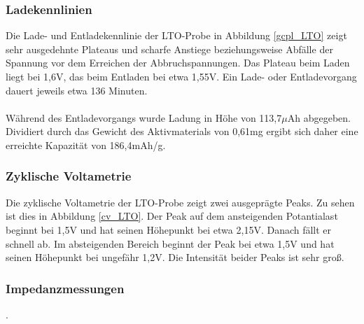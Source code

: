 \documentclass[a4paper, 11pt, headsepline,footsepline,twoside,abstract]{scrbook}
\begin{document}
\subsubsection{Ladekennlinien}
Die Lade- und Entladekennlinie der LTO-Probe in Abbildung \ref{gcpl_LTO} zeigt sehr ausgedehnte Plateaus und scharfe Anstiege beziehungsweise Abfälle der Spannung vor dem Erreichen der Abbruchspannungen. Das Plateau beim Laden liegt bei 1,6V, das beim Entladen bei etwa 1,55V. Ein Lade- oder Entladevorgang dauert jeweils etwa 136 Minuten.
\\\\
Während des Entladevorgangs wurde Ladung in Höhe von 113,7$\mu$Ah abgegeben. Dividiert durch das Gewicht des Aktivmaterials von 0,61mg ergibt sich daher eine erreichte Kapazität von 186,4mAh/g.
\subsubsection{Zyklische Voltametrie}
Die zyklische Voltametrie der LTO-Probe zeigt zwei ausgeprägte Peaks. Zu sehen ist dies in Abbildung \ref{cv_LTO}. Der Peak auf dem ansteigenden Potantialast beginnt bei 1,5V und hat seinen Höhepunkt bei etwa 2,15V. Danach fällt er schnell ab. Im absteigenden Bereich beginnt der Peak bei etwa 1,5V und hat seinen Höhepunkt bei ungefähr 1,2V. Die Intensität beider Peaks ist sehr groß.
\subsubsection{Impedanzmessungen}
.
\newpage
\end{document}
